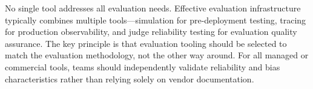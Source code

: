 \begin{table}[htbp]
\centering
\caption{Evaluation needs mapped to recommended tool categories.}
\label{tab:tool_selection}
\scriptsize
\setlength{\tabcolsep}{3pt}
\end{table}

No single tool addresses all evaluation needs. Effective evaluation infrastructure typically combines multiple tools---simulation for pre-deployment testing, tracing for production observability, and judge reliability testing for evaluation quality assurance. The key principle is that evaluation tooling should be selected to match the evaluation methodology, not the other way around. For all managed or commercial tools, teams should independently validate reliability and bias characteristics rather than relying solely on vendor documentation.

